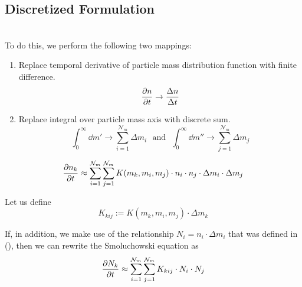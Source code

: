  
    \newpage\subsection{Discretized Formulation}

         \\

        To do this, we perform the following two mappings:
        \begin{enumerate}
            \item Replace temporal derivative of particle mass distribution function with 
                finite difference.
                \begin{equation}
                    \frac{\partial n}{\partial t} \to \frac{\Delta n}{\Delta t}
                \end{equation}
            \item Replace integral over particle mass axis with discrete sum.
                \begin{equation}
                    \int_0^\infty \dd m' \to \sum_{i=1}^{\mathcal N_m} \Delta m_i
                    \ \ \ \text{and}\ \ \
                    \int_0^\infty \dd m'' \to \sum_{j=1}^{\mathcal N_m} \Delta m_j
                \end{equation} 
        \end{enumerate}

        \begin{equation}
            \label{eq:discrete_smoluchowski_equation}
            \frac{\partial n_k}{\partial t}
                \approx \sum_{i=1}^{\mathcal N_m}\sum_{j=1}^{\mathcal N_m}
                    K(m_k,m_i,m_j)\cdot n_i\cdot n_j\cdot\Delta m_i\cdot\Delta m_j
        \end{equation}
    
        Let us define
        \begin{equation}
            K_{kij}
                := K(m_k,m_i,m_j)\cdot\Delta m_k
        \end{equation}
    
        If, in addition, we make use of the relationship $N_i=n_i\cdot\Delta m_i$ that was defined 
        in (\todo{cite}), then we can rewrite the Smoluchowski equation as
        \begin{equation}
            \frac{\partial N_k}{\partial t}
                \approx \sum_{i=1}^{\mathcal N_m}\sum_{j=1}^{\mathcal N_m} K_{kij}\cdot N_i\cdot N_j
        \end{equation}
    
